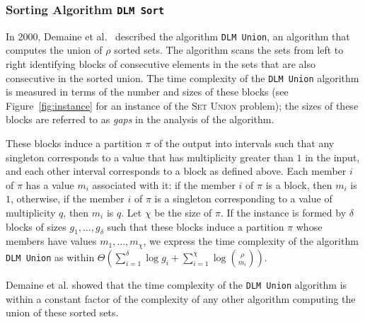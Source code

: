 \subsubsection{Sorting Algorithm \texttt{DLM
    Sort}}
\label{sec:dlm-sort}

In 2000, Demaine et
al.~\cite{2000-SODA-AdaptiveSetIntersectionsUnionsAndDifferences-DemaineLopezOrtizMunro}
described the algorithm \texttt{DLM Union}, an algorithm that computes
the union of $\rho$ sorted sets.  The algorithm scans the sets from
left to right identifying blocks of consecutive elements in the sets
that are also consecutive in the sorted union. The time complexity of
the \texttt{DLM Union} algorithm is measured in terms of the number
and sizes of these blocks (see Figure~\ref{fig:instance} for an
instance of the \textsc{Set Union} problem); the sizes of these blocks
are referred to as \emph{gaps} in the analysis of the algorithm.
\begin{INUTILE}
  These blocks induce a partition $\pi$ of the output into intervals
  such that any singleton corresponds to a value that has multiplicity
  greater than $1$ in the input, and each other interval corresponds
  to a block as defined above. Each member $i$ of $\pi$ has a value
  $m_i$ associated with it: if the member $i$ of $\pi$ is a block,
  then $m_i$ is $1$, otherwise, if the member $i$ of $\pi$ is a
  singleton corresponding to a value of multiplicity $q$, then $m_i$
  is $q$.
%
  Let $\chi$ be the size of $\pi$.
%
  If the instance is formed by $\delta$ blocks of sizes
  $g_1, \dots, g_{\delta}$ such that these blocks induce a partition
  $\pi$ whose members have values $m_1, \dots, m_{\chi}$, we express
  the time complexity of the algorithm \texttt{DLM Union} as within
  $\Theta(\sum^{\delta}_{i=1}\log g_i +
  \sum^{\chi}_{i=1}\log{\binom{\rho}{m_i}})$.
\end{INUTILE}
%
Demaine et al. showed that the time complexity of the \texttt{DLM
  Union} algorithm is within a constant factor of the complexity of
any other algorithm computing the union of these sorted sets.


